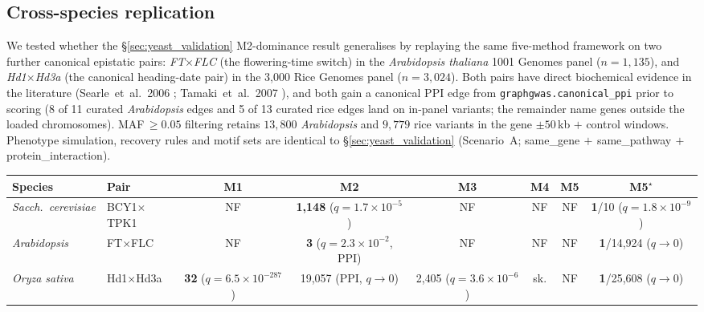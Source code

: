 \subsection{Cross-species replication}\label{sec:cross_species}

We tested whether the §\ref{sec:yeast_validation} M2-dominance result
generalises by replaying the same five-method framework on two further
canonical epistatic pairs: \emph{FT}$\times$\emph{FLC} (the
flowering-time switch) in the \emph{Arabidopsis thaliana} 1001 Genomes
panel ($n=1{,}135$), and \emph{Hd1}$\times$\emph{Hd3a} (the canonical
heading-date pair) in the 3{,}000 Rice Genomes panel ($n=3{,}024$).
Both pairs have direct biochemical evidence in the literature
(Searle~et~al.\ 2006 \cite{searle2006}; Tamaki~et~al.\ 2007
\cite{tamaki2007}), and both gain a canonical PPI edge from
\texttt{graphgwas.canonical\_ppi} prior to scoring (8 of 11 curated
\emph{Arabidopsis} edges and 5 of 13 curated rice edges land on
in-panel variants; the remainder name genes outside the loaded
chromosomes). MAF\,$\geq 0.05$ filtering retains $13{,}800$
\emph{Arabidopsis} and $9{,}779$ rice variants in the gene
$\pm 50\,$kb $+$ control windows. Phenotype simulation, recovery rules
and motif sets are identical to §\ref{sec:yeast_validation}
(Scenario~A; same\_gene$\,+\,$same\_pathway$\,+\,$protein\_interaction).

\begin{center}\small
\begin{tabular}{llcccccc}
\toprule
Species & Pair & M1 & M2 & M3 & M4 & M5 & M5$^\star$\\
\midrule
\emph{Sacch.\ cerevisiae} & BCY1$\times$TPK1   & NF & \textbf{1{,}148} ($q{=}1.7\!\times\!10^{-5}$) & NF & NF & NF & \textbf{1}/10 ($q{=}1.8\!\times\!10^{-9}$)\\
\emph{Arabidopsis}        & FT$\times$FLC      & NF & \textbf{3} ($q{=}2.3\!\times\!10^{-2}$, PPI) & NF & NF & NF & \textbf{1}/14{,}924 ($q{\to}0$)\\
\emph{Oryza sativa}       & Hd1$\times$Hd3a    & \textbf{32} ($q{=}6.5\!\times\!10^{-287}$) & 19{,}057 (PPI, $q{\to}0$) & 2{,}405 ($q{=}3.6\!\times\!10^{-6}$) & sk. & NF & \textbf{1}/25{,}608 ($q{\to}0$)\\
\bottomrule
\end{tabular}
\end{center}


